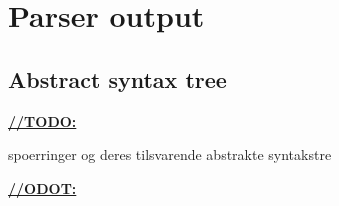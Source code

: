 \section{Parser output}
\subsection{Abstract syntax tree}
\underline{\textbf{\LARGE //TODO:}}

spoerringer og deres tilsvarende abstrakte syntakstre

\underline{\textbf{\LARGE //ODOT:}}